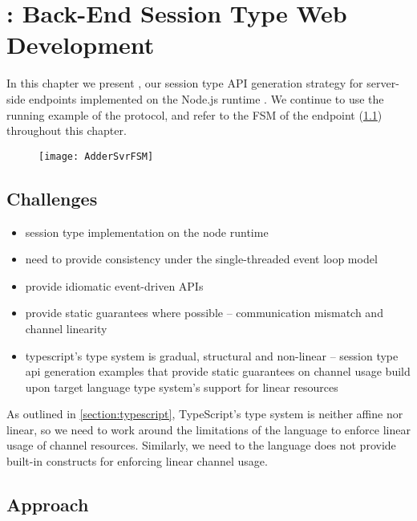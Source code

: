 \chapter{: Back-End Session Type Web Development}
\label{chap:node}

In this chapter we present ,
our session type API generation strategy for 
server-side endpoints implemented on the Node.js runtime \cite{node}.
We continue to use the running example of the 
protocol, and refer to the FSM of the  endpoint
(\cref{fig:addersvrfsm}) throughout this chapter.

\begin{figure}[!b]
\centering
\texttt{[image: AdderSvrFSM]}
\label{fig:addersvrfsm}
\end{figure}

\section{Challenges}
\label{section:nodechallenges}
\begin{itemize}
\item session type implementation on the node runtime
\item need to provide consistency under the single-threaded event loop model
\item provide idiomatic event-driven APIs
\item provide static guarantees where possible -- communication mismatch and channel linearity
\item typescript's type system is gradual, structural and non-linear -- session type api generation examples that provide static guarantees on channel usage build upon target language type system's support for linear resources
\end{itemize}

As outlined in \cref{section:typescript}, TypeScript's type system
is neither affine nor linear, so we need to work around the 
limitations of the language to enforce linear usage of channel resources.
Similarly, we need to 
the language does not provide
built-in constructs for enforcing linear channel usage.

\section{Approach}
\label{section:nodeapproach}

